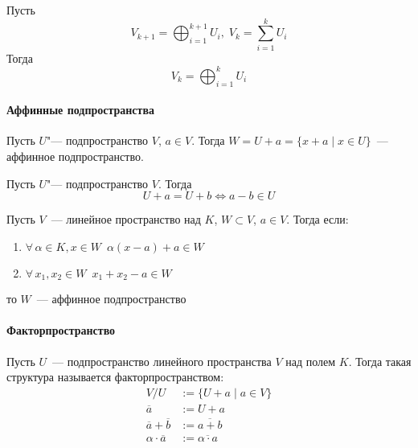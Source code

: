 \documentclass[12pt]{../../notes}
\begin{document}
\begin{stat}\label{stat:dirsumsubfact}
  Пусть 
  \[
    V_{k+1} = \bigoplus_{i=1}^{k+1} U_i, \; V_k = \sum_{i=1}^k U_i
  \]
  Тогда
  \[
    V_k = \bigoplus_{i=1}^k U_i
  \]
\end{stat}

\paragraph{Аффинные подпространства}

\begin{defn}\label{defn:affinsubspc}
  Пусть $U$"--- подпространство $V$, $a\in V$. Тогда $W = U + a = \{x+a\mid x\in U\}$~--- аффинное 
  подпространство. 
\end{defn}

\begin{lem}\label{lem:affinfact}
  Пусть $U$"--- подпространство $V$. Тогда
  \[
    U + a = U + b \Leftrightarrow a - b \in U
  \]
\end{lem}
\begin{lem}\label{lem:affinprop}
  Пусть $V$~--- линейное пространство над $K$, $W \subset V$, $a\in V$.
  Тогда если:
  \begin{enumerate}
    \item $\forall\, \alpha \in K, x \in W \;\: \alpha(x-a) + a \in W$  
    \item $\forall\, x_1,x_2 \in W \;\: x_1 + x_2 - a \in W$  
  \end{enumerate}
  то $W$~--- аффинное подпространство
\end{lem}

\paragraph{Факторпространство}
\begin{defn}\label{defn:factorspace}
  Пусть $U$~--- подпространство линейного пространства $V$ над полем $K$.
  Тогда такая структура называется факторпространством:
  \begin{align*}
    V / U &:= \{ U + a \mid a\in  V \} \\
    \overline a &:= U+a \\
    \overline a + \overline b &:= \overline{a+b} \\
    \alpha \cdot \overline a &:= \overline{\alpha \cdot a}
  \end{align*}
\end{defn}
\end{document}
